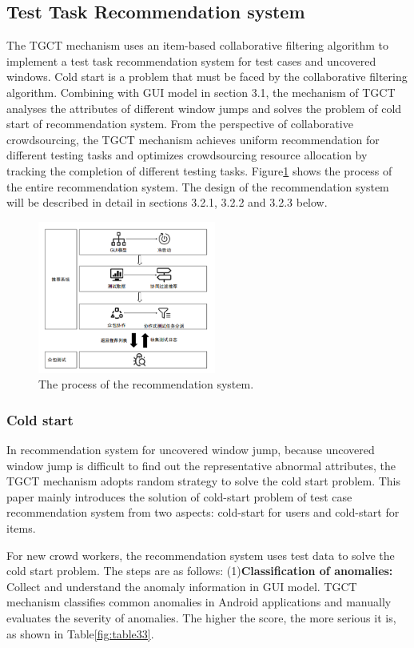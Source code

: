 \subsection{Test Task Recommendation system}
The TGCT mechanism uses an item-based collaborative filtering algorithm to implement a test task recommendation system for test cases and uncovered windows. Cold start is a problem that must be faced by the collaborative filtering algorithm. Combining with GUI model in section 3.1, the mechanism of TGCT analyses the attributes of different window jumps and solves the problem of cold start of recommendation system. From the perspective of collaborative crowdsourcing, the TGCT mechanism achieves uniform recommendation for different testing tasks and optimizes crowdsourcing resource allocation by tracking the completion of different testing tasks. Figure\ref{fig:recomd} shows the process of the entire recommendation system. The design of the recommendation system will be described in detail in sections 3.2.1, 3.2.2 and 3.2.3 below.
\begin{figure}[htbp]
\centering
\centerline{\includegraphics[width=\columnwidth,height=5cm]{fig/7.png}}
\caption{The process of the recommendation system.}
\label{fig:recomd}
\end{figure}

\subsubsection{Cold start}
In recommendation system for uncovered window jump, because uncovered window jump is difficult to find out the representative abnormal attributes, the TGCT mechanism adopts random strategy to solve the cold start problem. This paper mainly introduces the solution of cold-start problem of test case recommendation system from two aspects: cold-start for users and cold-start for items.

For new crowd workers, the recommendation system uses test data to solve the cold start problem. The steps are as follows:
(1)\textbf{Classification of anomalies:} Collect and understand the anomaly information in GUI model. TGCT mechanism classifies common anomalies in Android applications and manually evaluates the severity of anomalies. The higher the score, the more serious it is, as shown in Table\ref{fig:table33}.

